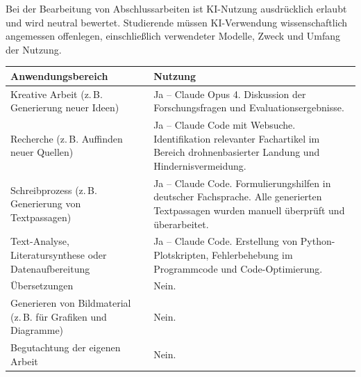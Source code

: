 
Bei der Bearbeitung von Abschlussarbeiten ist KI-Nutzung ausdrücklich erlaubt und wird neutral bewertet. Studierende müssen KI-Verwendung \glqq wissenschaftlich angemessen\grqq{} offenlegen, einschließlich verwendeter Modelle, Zweck und Umfang der Nutzung.

\bigskip

\noindent
\begin{longtable}{>{\raggedright\arraybackslash}p{4.5cm} >{\raggedright\arraybackslash}p{9.5cm}}
\toprule
\textbf{Anwendungsbereich} & \textbf{Nutzung} \\
\midrule
\endhead
Kreative Arbeit \newline
{\small (z.\,B. Generierung neuer Ideen)}
  & Ja -- Claude Opus 4. Diskussion der Forschungsfragen und Evaluationsergebnisse. \\
\midrule
Recherche \newline
{\small (z.\,B. Auffinden neuer Quellen)}
  & Ja -- Claude Code mit Websuche. Identifikation relevanter Fachartikel im Bereich drohnenbasierter Landung und Hindernisvermeidung. \\
\midrule
Schreibprozess \newline
{\small (z.\,B. Generierung von Textpassagen)}
  & Ja -- Claude Code. Formulierungshilfen in deutscher Fachsprache. Alle generierten Textpassagen wurden manuell überprüft und überarbeitet. \\
\midrule
Text-Analyse, Literatursynthese oder Datenaufbereitung
  & Ja -- Claude Code. Erstellung von Python-Plotskripten, Fehlerbehebung im Programmcode und Code-Optimierung. \\
\midrule
Übersetzungen
  & Nein. \\
\midrule
Generieren von Bildmaterial \newline
{\small (z.\,B. für Grafiken und Diagramme)}
  & Nein. \\
\midrule
Begutachtung der eigenen Arbeit
  & Nein. \\
\bottomrule
\end{longtable}
